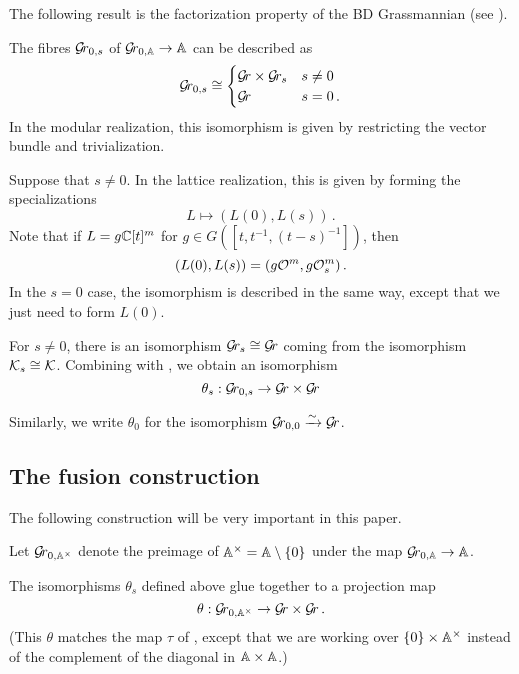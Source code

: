 \documentclass{article}
\begin{document}
The following result is the factorization property of the BD Grassmannian (see \cite[Prop. 3.13]{zhu2016introduction}).
\begin{proposition}\label{pr:polyno-taylor}
    The fibres \( \Gr_{0,s}\) of \( \Grbd \rightarrow \AA\) can be described as 
    \begin{equation*}
    \Gr_{0,s} \cong 
        \begin{cases} 
            \Gr \times \Gr_s & s \ne 0 \\
            \Gr              & s = 0\,.
        \end{cases}
    \end{equation*}
    In the modular realization, this isomorphism is given by restricting the vector bundle and trivialization.
    
    Suppose that \( s \ne 0 \). In the lattice realization, this is given by forming the specializations 
    $$
        L \mapsto (L(0), L(s))\,.
    $$
    Note that if \( L = g \CC[t]^m\) for \( g \in G([t,t^{-1}, (t-s)^{-1}])\), then 
    $$
        (L(0), L(s)) = (g \cO^m, g\cO^m_s)\,. 
    $$
    In the \( s = 0 \) case, the isomorphism is described in the same way, except that we just need to form \( L(0)\).
\end{proposition}

For \( s \ne 0\), there is an isomorphism \( \Gr_s \cong \Gr \) coming from the isomorphism \( \Ks \cong \cK\). 
% 
Combining with , we obtain an isomorphism
$$
    \theta_s : \Gr_{0,s} \rightarrow \Gr \times \Gr 
$$

Similarly, we write \( \theta_0\) for the isomorphism \( \Gr_{0,0} \xrightarrow{\sim} \Gr \).
% 

\subsection{The fusion construction}\label{ss:fuscon}
% 
The following construction will be very important in this paper.  

Let \( \Gr_{0, \AA^\times} \) denote the preimage of \(\Ax = \AA \setminus \{0\}\) under the map \(\Gr_{0,\AA} \rightarrow \AA \).  

The isomorphisms \( \theta_s \) defined above glue together to a projection map
\begin{equation}\label{eq:mvitau}
    \theta : \Gr_{0, \AA^\times} \rightarrow \Gr \times \Gr \, .
\end{equation}
(This \(\theta\) matches the map \( \tau \) of \cite{mirkovic2007geometric}, except that we are working over \( \{0 \} \times \AA^\times\) instead of the complement of the diagonal in \( \AA\times\AA \).)
\end{document}
